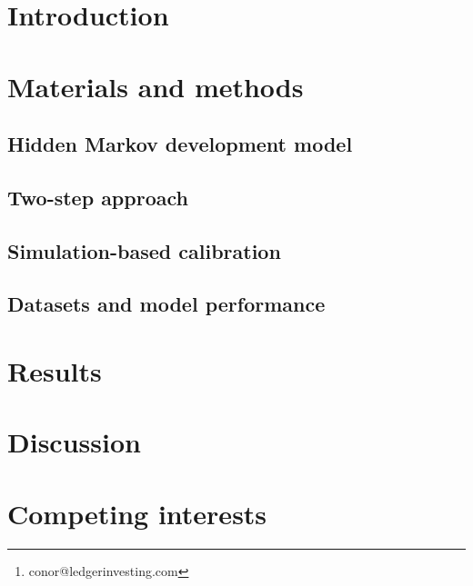 \documentclass[12pt]{article}
\author[]{Conor Goold\thanks{conor@ledgerinvesting.com}}
\affil[]{Ledger Investing, Inc.}
\begin{document}
\maketitle



\section{Introduction}
\label{sec:introduction}


\section{Materials and methods}
\label{sec:methods}

\subsection{Hidden Markov development model}


\subsection{Two-step approach}


\subsection{Simulation-based calibration}


\subsection{Datasets and model performance}


\section{Results}
\label{sec:results}


\section{Discussion}
\label{sec:discussion}


\section{Competing interests}
\label{sec:interests}




\end{document}
